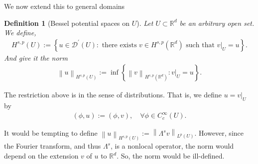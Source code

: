 \documentclass[
    a4paper,
    DIV=14,
    abstract=true,
    numbers=noenddot
]
{scrartcl}
\newtheorem{definition}[theorem]{Definition}
\theoremstyle{definition}
\newcommand{\set}[1]{\left\{#1\right\}}
\renewcommand{\norm}[1]{\left\lVert #1 \right\rVert}\renewcommand{\abs}[1]{\left| #1 \right|}
\newcommand\restr[2]{\left.#1\right|_{#2}}
\newcommand{\R}{\mathbb{R}}
\begin{document}
We now extend this to general domains
\begin{definition}[Bessel potential spaces on $U$]\label{bessel potential def U}
  Let $U \subset \R^d$ be an arbitrary open set. We define,
  \begin{align*}
    H^{s,p}(U):=\left\{u \in \mathcal{D}^{\prime}(U): \text{ there exists } v \in H^{s,p}(\R^d) \text{ such that } \restr{v}{U}=u\right\}.
  \end{align*}
  And give it the norm
  \begin{align*}
    \norm{u}_{H^{s,p}(U)}:= \inf \set{\norm{v}_{H^{s,p}(\R^d)}: \restr{v}{U}=u}.
  \end{align*}
\end{definition}
The restriction above is in the sense of distributions. That is, we define $u=\restr{v}{U}$ by
\begin{align*}
  (\phi,u):=(\phi,v), \quad \forall \phi \in C_c^\infty(U).
\end{align*}

It would be tempting to define $\norm{u}_{H^{s,p}(U)}:=\norm{\Lambda^s v}_{L^p(U)}$. However, since the Fourier transform, and thus $\Lambda^s$, is a nonlocal operator, the norm would depend on the extension $v$  of $u$ to $\R^d$. So, the norm would be ill-defined.
\end{document}
